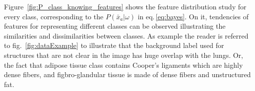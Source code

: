 \documentclass[a4paper, 10pt, conference]{llncs}      %
\begin{document}
Figure~\ref{fig:P_class_knowing_features} shows the feature distribution study for every class, corresponding to the $P(\bar{x}_a|\omega)$ in eq.\,\ref{eq:bayes}. On it, tendencies of features for representing different classes can be observed illustrating the similarities and dissimilarities between classes. As example the reader is referred to fig.~\ref{fig:dataExample} to illustrate that the background label used for structures that are not clear in the image has huge overlap with the lungs. Or, the fact that adipose tissue class contains Cooper's ligaments which are highly dense fibers, and figbro-glandular tissue is made of dense fibers and unstructured fat.

\begin{figure}[Htbp]
\centering
\end{figure}
\end{document}
